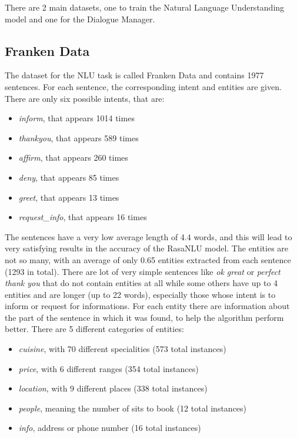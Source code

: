 \documentclass[11pt,a4paper]{article}
\begin{document}
There are 2 main datasets, one to train the Natural Language Understanding model and one for the Dialogue Manager.

\subsection{Franken Data}

The dataset for the NLU task is called Franken Data and contains 1977 sentences. For each sentence, the corresponding intent and entities are given. There are only six possible intents, that are: 

\begin{itemize}
\item \textit{inform}, that appears 1014 times
\item \textit{thankyou}, that appears 589 times
\item \textit{affirm}, that appears 260 times
\item \textit{deny}, that appears 85 times
\item \textit{greet}, that appears 13 times
\item \textit{request\_info}, that appears 16 times
\end{itemize}

The sentences have a very low average length of 4.4 words, and this will lead to very satisfying results in the accuracy of the RasaNLU model.
The entities are not so many, with an average of only 0.65 entities extracted from each sentence (1293 in total). There are lot of very simple sentences like \textit{ok great} or \textit{perfect thank you} that do not contain entities at all while some others have up to 4 entities and are longer (up to 22 words), especially those whose intent is to inform or request for informations. For each entity there are information about the part of the sentence in which it was found, to help the algorithm perform better. There are 5 different categories of entities:

\begin{itemize}
\item \textit{cuisine}, with 70 different specialities (573 total instances)
\item \textit{price}, with 6 different ranges (354 total instances)
\item \textit{location}, with 9 different places (338 total instances)
\item \textit{people}, meaning the number of sits to book (12 total instances)
\item \textit{info}, address or phone number (16 total instances)
\end{itemize}
\end{document}
